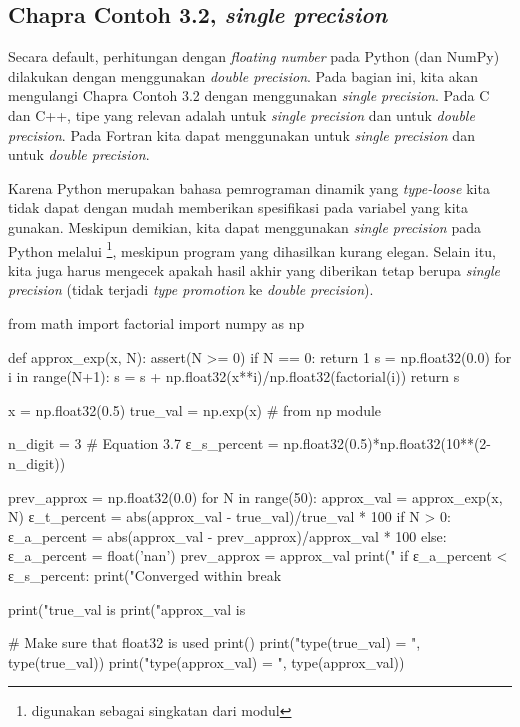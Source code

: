 \subsection{Chapra Contoh 3.2, \textit{single precision}}
Secara default, perhitungan dengan \textit{floating number} pada Python (dan NumPy)
dilakukan dengan menggunakan \textit{double precision}. Pada bagian ini, kita akan
mengulangi Chapra Contoh 3.2 dengan menggunakan \textit{single precision}.
Pada C dan C++, tipe yang relevan adalah 
untuk \textit{single precision} dan  untuk \textit{double
precision}.
Pada Fortran kita dapat menggunakan  untuk \textit{single precision}
dan  untuk \textit{double precision}.

Karena Python merupakan bahasa pemrograman dinamik yang \textit{type-loose} kita tidak dapat
dengan mudah memberikan spesifikasi pada variabel yang kita gunakan. Meskipun demikian, 
kita dapat menggunakan \textit{single precision} pada Python melalui
\footnote{ digunakan sebagai
singkatan dari modul },
meskipun program yang dihasilkan kurang elegan. Selain itu, kita juga harus mengecek
apakah hasil akhir yang diberikan tetap berupa \textit{single precision} (tidak terjadi
\textit{type promotion} ke \textit{double precision}).

\begin{pythoncode}
from math import factorial
import numpy as np
  
def approx_exp(x, N):
    assert(N >= 0)
    if N == 0:
        return 1
    s = np.float32(0.0)
    for i in range(N+1):
        s = s + np.float32(x**i)/np.float32(factorial(i))
    return s
  
x = np.float32(0.5)
true_val = np.exp(x) # from np module
  
n_digit = 3
# Equation 3.7
ε_s_percent = np.float32(0.5)*np.float32(10**(2-n_digit))
  
prev_approx = np.float32(0.0)
for N in range(50):
    approx_val = approx_exp(x, N)
    ε_t_percent = abs(approx_val - true_val)/true_val * 100
    if N > 0:
        ε_a_percent = abs(approx_val - prev_approx)/approx_val * 100
    else:
        ε_a_percent = float('nan')
    prev_approx = approx_val
    print("%
    if ε_a_percent < ε_s_percent:
        print("Converged within %
        break
  
print("true_val   is %
print("approx_val is %
  
# Make sure that float32 is used
print()
print("type(true_val)   = ", type(true_val))
print("type(approx_val) = ", type(approx_val))
\end{pythoncode}

